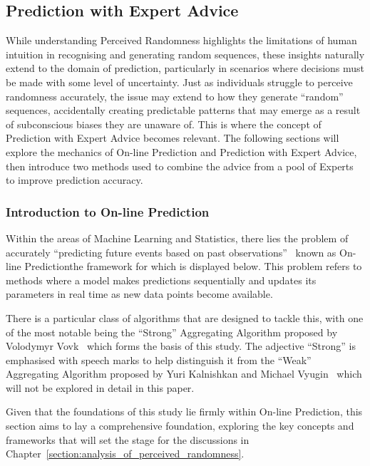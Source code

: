 \subsection{Prediction with Expert Advice}\label{subsection:prediction_with_expert_advice}
While understanding Perceived Randomness highlights the limitations of human intuition in recognising and generating random sequences, these insights naturally extend to the domain of prediction, particularly in scenarios where decisions must be made with some level of uncertainty. Just as individuals struggle to perceive randomness accurately, the issue may extend to how they generate ``random'' sequences, accidentally creating predictable patterns that may emerge as a result of subconscious biases they are unaware of. This is where the concept of Prediction with Expert Advice becomes relevant. The following sections will explore the mechanics of On-line Prediction and Prediction with Expert Advice, then introduce two methods used to combine the advice from a pool of Experts to improve prediction accuracy.

\subsubsection{Introduction to On-line Prediction}\label{subsubsection:introduction_to_on-line_prediction}
Within the areas of Machine Learning and Statistics, there lies the problem of accurately ``predicting future events based on past observations''~\cite{cesa-bianchi:1997} known as On-line Prediction\textemdash{}the framework for which is displayed below. This problem refers to methods where a model makes predictions sequentially and updates its parameters in real time as new data points become available.

There is a particular class of algorithms that are designed to tackle this, with one of the most notable being the ``Strong'' Aggregating Algorithm proposed by Volodymyr Vovk~\cite{vovk:1990} which forms the basis of this study. The adjective ``Strong'' is emphasised with speech marks to help distinguish it from the ``Weak'' Aggregating Algorithm proposed by Yuri Kalnishkan and Michael Vyugin~\cite{kalnishkan/vyugin:2008} which will not be explored in detail in this paper.

Given that the foundations of this study lie firmly within On-line Prediction, this section aims to lay a comprehensive foundation, exploring the key concepts and frameworks that will set the stage for the discussions in Chapter~\ref{section:analysis_of_perceived_randomness}.

